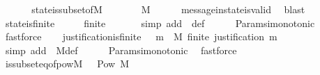 \begin{isabellebody}
\ \ \isamarkupfalse%
%
\endisatagproof
{\isafoldproof}%
%
\isadelimproof
\isanewline
%
\endisadelimproof
\isanewline
\ \ \isamarkupfalse%
\ state{\isacharunderscore}is{\isacharunderscore}subset{\isacharunderscore}of{\isacharunderscore}M\ {\isacharcolon}\ {\isachardoublequoteopen}{\isasymforall}\ {\isasymsigma}\ {\isasymin}\ {\isasymSigma}{\isachardot}\ {\isasymsigma}\ {\isasymsubseteq}\ M{\isachardoublequoteclose}\isanewline
%
\isadelimproof
\ \ \ \ %
\endisadelimproof
%
\isatagproof
{}\isamarkupfalse%
\ message{\isacharunderscore}in{\isacharunderscore}state{\isacharunderscore}is{\isacharunderscore}valid\ \isamarkupfalse%
\ blast%
\endisatagproof
{\isafoldproof}%
%
\isadelimproof
\isanewline
%
\endisadelimproof
\ \ \isanewline
\ \ \isamarkupfalse%
\ state{\isacharunderscore}is{\isacharunderscore}finite\ {\isacharcolon}\ {\isachardoublequoteopen}{\isasymforall}\ {\isasymsigma}\ {\isasymin}\ {\isasymSigma}{\isachardot}\ finite\ {\isasymsigma}{\isachardoublequoteclose}\isanewline
%
\isadelimproof
\ \ \ \ %
\endisadelimproof
%
\isatagproof
{}\isamarkupfalse%
\ {\isacharparenleft}simp\ add{\isacharcolon}\ \ {\isasymSigma}{\isacharunderscore}def{\isacharparenright}\isanewline
\ \ \ \ \isamarkupfalse%
\ Params{\isachardot}{\isasymSigma}i{\isacharunderscore}monotonic\ \isamarkupfalse%
\ fastforce%
\endisatagproof
{\isafoldproof}%
%
\isadelimproof
\isanewline
%
\endisadelimproof
\isanewline
\ \ \isamarkupfalse%
\ justification{\isacharunderscore}is{\isacharunderscore}finite\ {\isacharcolon}\ {\isachardoublequoteopen}{\isasymforall}\ m\ {\isasymin}\ M{\isachardot}\ finite\ {\isacharparenleft}justification\ m{\isacharparenright}{\isachardoublequoteclose}\isanewline
%
\isadelimproof
\ \ \ \ %
\endisadelimproof
%
\isatagproof
{}\isamarkupfalse%
\ {\isacharparenleft}simp\ add{\isacharcolon}\ \ M{\isacharunderscore}def{\isacharparenright}\isanewline
\ \ \ \ \isamarkupfalse%
\ Params{\isachardot}{\isasymSigma}i{\isacharunderscore}monotonic\ \isamarkupfalse%
\ fastforce%
\endisatagproof
{\isafoldproof}%
%
\isadelimproof
\isanewline
%
\endisadelimproof
\isanewline
\ \ \isamarkupfalse%
\ {\isasymSigma}is{\isacharunderscore}subseteq{\isacharunderscore}of{\isacharunderscore}pow{\isacharunderscore}M{\isacharcolon}\ {\isachardoublequoteopen}{\isasymSigma}\ {\isasymsubseteq}\ Pow\ M{\isachardoublequoteclose}\isanewline
%
\isadelimproof
\ \ \ \ %
\endisadelimproof
%

\end{isabellebody}
